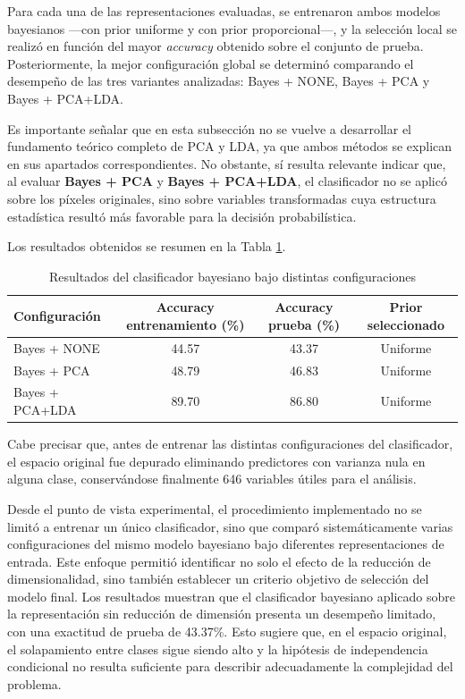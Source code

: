 \documentclass[11pt, a4paper]{article}
\begin{document}
Para cada una de las representaciones evaluadas, se entrenaron ambos modelos bayesianos —con prior uniforme y con prior proporcional—, y la selección local se realizó en función del mayor \textit{accuracy} obtenido sobre el conjunto de prueba. Posteriormente, la mejor configuración global se determinó comparando el desempeño de las tres variantes analizadas: Bayes + NONE, Bayes + PCA y Bayes + PCA+LDA.

Es importante señalar que en esta subsección no se vuelve a desarrollar el fundamento teórico completo de PCA y LDA, ya que ambos métodos se explican en sus apartados correspondientes. No obstante, sí resulta relevante indicar que, al evaluar \textbf{Bayes + PCA} y \textbf{Bayes + PCA+LDA}, el clasificador no se aplicó sobre los píxeles originales, sino sobre variables transformadas cuya estructura estadística resultó más favorable para la decisión probabilística.

Los resultados obtenidos se resumen en la Tabla \ref{tab:bayes_results}.

\begin{table}[H]
\centering
\caption{Resultados del clasificador bayesiano bajo distintas configuraciones}
\label{tab:bayes_results}
\begin{tabular}{lccc}
\toprule
Configuración & Accuracy entrenamiento (\%) & Accuracy prueba (\%) & Prior seleccionado \\
\midrule
Bayes + NONE & 44.57 & 43.37 & Uniforme \\
Bayes + PCA & 48.79 & 46.83 & Uniforme \\
Bayes + PCA+LDA & 89.70 & 86.80 & Uniforme \\
\bottomrule
\end{tabular}
\end{table}

Cabe precisar que, antes de entrenar las distintas configuraciones del clasificador, el espacio original fue depurado eliminando predictores con varianza nula en alguna clase, conservándose finalmente 646 variables útiles para el análisis.

Desde el punto de vista experimental, el procedimiento implementado no se limitó a entrenar un único clasificador, sino que comparó sistemáticamente varias configuraciones del mismo modelo bayesiano bajo diferentes representaciones de entrada. Este enfoque permitió identificar no solo el efecto de la reducción de dimensionalidad, sino también establecer un criterio objetivo de selección del modelo final.
Los resultados muestran que el clasificador bayesiano aplicado sobre la representación sin reducción de dimensión presenta un desempeño limitado, con una exactitud de prueba de 43.37\%. Esto sugiere que, en el espacio original, el solapamiento entre clases sigue siendo alto y la hipótesis de independencia condicional no resulta suficiente para describir adecuadamente la complejidad del problema.
\end{document}
